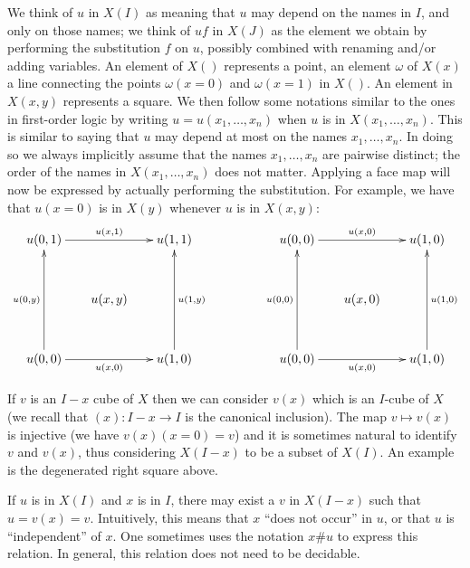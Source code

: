 \documentclass[10pt,a4paper]{article}
\begin{document}
We think of $u$ in $X(I)$ as meaning that $u$ may depend on the names
in $I$, and only on those names; we think of $uf$ in $X(J)$ as the
element we obtain by performing the substitution $f$ on $u$, possibly
combined with renaming and/or adding variables.  An element of $X()$
represents a point, an element $\omega$ of $X(x)$ a line connecting
the points $\omega(x=0)$ and $\omega(x=1)$ in $X()$. An element in
$X(x,y)$ represents a square.  We then follow some notations similar
to the ones in first-order logic by writing $u = u(x_1,\dots,x_n)$
when $u$ is in $X(x_1,\dots,x_n)$. This is similar to saying that $u$
may depend at most on the names $x_1,\dots,x_n$.  In doing so we
always implicitly assume that the names $x_1,\dots,x_n$ are pairwise
distinct; the order of the names in $X(x_1,\dots,x_n)$ does not
matter. Applying a face map will now be expressed by actually
performing the substitution. For example, we have that $u(x=0)$ is in
$X(y)$ whenever $u$ is in $X(x,y)$:
\[
\xymatrix@R=1.1cm@C=.6cm{
u(0,1)\ar[rr]^{u(x,1)}                &      & u(1,1)                   &&&
u(0,0)\ar[rr]^{u(x,0)}                &      & u(1,0)                       \\
                                      &u(x,y)&                          &&&
                                      &u(x,0)&                              \\
u(0,0)\ar[rr]_{u(x,0)}\ar[uu]^{u(0,y)}&      & u(1,0)\ar[uu]_{u(1,y)}   &&&
u(0,0)\ar[rr]_{u(x,0)}\ar[uu]^{u(0,0)}&      & u(1,0)\ar[uu]_{u(1,0)}       \\
}
\]

If $v$ is an $I-x$ cube of $X$ then we can consider $v(x)$ which is an
$I$-cube of $X$ (we recall that $(x):I-x\to I$ is the canonical
inclusion). The map $v\longmapsto v(x)$ is injective (we have
$v(x)(x=0) = v$) and it is sometimes natural to identify $v$ and
$v(x)$, thus considering $X(I-x)$ to be a subset of $X(I)$. An example
is the degenerated right square above.

 If $u$ is in $X(I)$ and $x$ is in $I$, there may exist a $v$ in $X(I-x)$ such that
$u = v(x) = v$.  Intuitively, this means that $x$ ``does not occur'' in $u$, or that $u$ is
``independent'' of $x$. One sometimes uses the notation $x\#u$ to express this relation. In general, this relation does
not need to be decidable.
\end{document}
